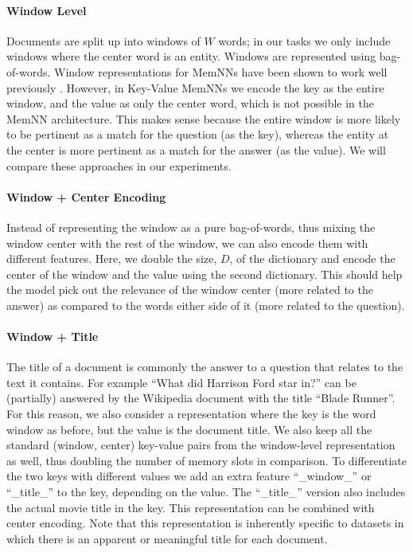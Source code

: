 \paragraph{Window Level}
Documents are split up into windows of $W$ words; in our tasks we only include
windows where the center word is an entity. Windows are represented using bag-of-words.
Window representations for MemNNs have been shown to work well previously
\citep{hill2015goldilocks}.
However, in Key-Value MemNNs we encode the key as the entire window, and the value
as only the center word, which is not possible in the MemNN architecture.
This makes sense because the entire window is more likely to be pertinent as a match
for the question (as the key), whereas the entity at the center is more pertinent
as a match for the answer (as the value). We will compare these approaches in our
experiments.

\paragraph{Window + Center Encoding}
Instead of representing the window as a pure bag-of-words, thus mixing the window center
with the rest of the window, we can also encode them with different features. Here,
we double the size, $D$, of the dictionary and encode the center of the window and the value
 using the second dictionary. This should help the model pick out the relevance
of the window center (more related to the answer)
as compared to the words either side of it (more related to the question).


\paragraph{Window + Title}
The title of a document is commonly the answer to a question that relates to the text
it contains. For example ``What did Harrison Ford star in?'' can be (partially) answered by the
Wikipedia document with the title ``Blade Runner''. For this reason, we also consider
a representation where the key is the word window as before,
but the value is the document title.
We also keep all the standard (window, center) key-value pairs from the window-level
representation as well, thus doubling the number of memory slots in comparison.
To differentiate the two keys with different values we add an extra feature
``\_window\_'' or ``\_title\_'' to the key, depending on the value.
The ``\_title\_'' version also includes the actual movie title in the key.
This representation can be combined with center encoding. Note that this representation is inherently specific to datasets in which there is an apparent or meaningful title for each document.
